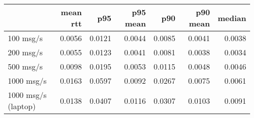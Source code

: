 \begin{tabular}{l|rrrrrr}
\rowcolor{gray!50}
 & mean rtt & p95 & p95 mean & p90 & p90 mean & median\\\hline
100 msg/s & 0.0056 & 0.0121 & 0.0044 & 0.0085 & 0.0041 & 0.0038 \\
200 msg/s & 0.0055 & 0.0123 & 0.0041 & 0.0081 & 0.0038 & 0.0034 \\
500 msg/s & 0.0098 & 0.0195 & 0.0053 & 0.0115 & 0.0048 & 0.0046 \\
1000 msg/s & 0.0163 & 0.0597 & 0.0092 & 0.0267 & 0.0075 & 0.0061 \\
1000 msg/s (laptop) & 0.0138 & 0.0407 & 0.0116 & 0.0307 & 0.0103 & 0.0091 \\
\end{tabular}
